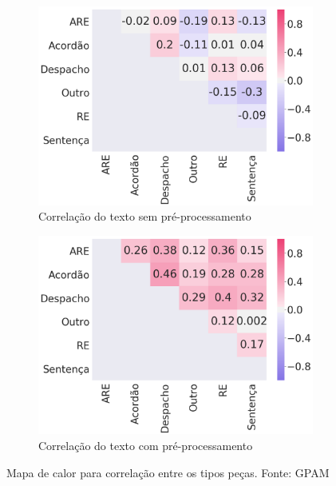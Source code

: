 \begin{figure}[ht]
    \centering
    \begin{subfigure}[b]{0.45\textwidth}
        \includegraphics[width=\textwidth]{figuras/corr}
        \caption{Correlação do texto sem pré-processamento}
    \end{subfigure}\hfill
    \begin{subfigure}[b]{0.45\textwidth}
        \includegraphics[width=\textwidth]{figuras/precorr}
        \caption{Correlação do texto com pré-processamento}
    \end{subfigure}
    \caption[Mapa de calor para correlação entre peças]{Mapa de calor para correlação entre os tipos peças. Fonte: GPAM \protect\footnotemark}
  \label{fig:correlacaoPecas}
\end{figure}

